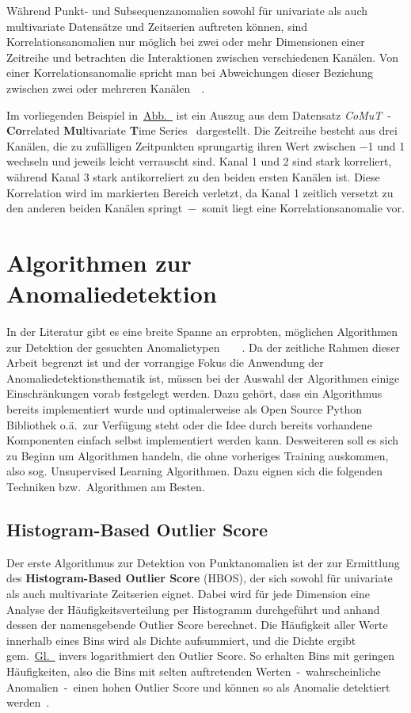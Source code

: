 Während Punkt- und Subsequenzanomalien sowohl für univariate als auch multivariate Datensätze und Zeitserien auftreten können, sind
Korrelationsanomalien nur möglich bei zwei oder mehr Dimensionen einer Zeitreihe und betrachten die Interaktionen zwischen
verschiedenen Kanälen. Von einer Korrelationsanomalie spricht man bei Abweichungen dieser Beziehung zwischen zwei oder mehreren
Kanälen~\cite[S.12-13]{Wenig2024}~\cite{Wenig2024a}.

Im vorliegenden Beispiel in~\hyperref[fig:correlation_Anomaly]{Abb.~} ist ein Auszug aus dem Datensatz
\textit{CoMuT}~- \textbf{Co}rrelated \textbf{Mu}lti\-variate \textbf{T}ime Series~\cite{NaumannCoMuT} dargestellt. Die Zeitreihe besteht
aus drei Kanälen, die zu zufälligen Zeitpunkten sprungartig ihren Wert zwischen $-$1 und 1 wechseln und jeweils leicht verrauscht sind.
Kanal 1 und 2 sind stark korreliert, während Kanal 3 stark antikorreliert zu den beiden ersten Kanälen ist. Diese Korrelation wird im
markierten Bereich verletzt, da Kanal 1 zeitlich versetzt zu den anderen beiden Kanälen springt~$-$~somit liegt eine
Korrelations\-anomalie vor.

\section{Algorithmen zur Anomaliedetektion}\label{sec:algorithmen}
In der Literatur gibt es eine breite Spanne an erprobten, möglichen Algorithmen zur Detektion der gesuchten
Anomalietypen~\cite{Schmidl2022}~\cite{BlazquezGarcia2020}~\cite{Mane2022}~\cite{Wenig2024a}. Da der zeitliche Rahmen dieser Arbeit
begrenzt ist und der vorrangige Fokus die Anwendung der Anomaliedetektionsthematik ist, müssen bei der Auswahl der Algorithmen
einige Einschränkungen vorab festgelegt werden. Dazu gehört, dass ein Algorithmus bereits implementiert wurde und optimalerweise als Open
Source Python Bibliothek o.ä.~zur Verfügung steht oder die Idee durch bereits vorhandene Komponenten einfach selbst implementiert
werden kann. Desweiteren soll es sich zu Beginn um Algorithmen handeln, die ohne vorheriges Training
auskommen, also sog. Unsupervised Learning Algorithmen. Dazu eignen sich die folgenden Techniken bzw.~Algorithmen am Besten.

\subsection{Histogram-Based Outlier Score}
Der erste Algorithmus zur Detektion von Punktanomalien ist der zur Ermittlung des \textbf{Histogram-Based Outlier Score} (HBOS), der sich
sowohl für univariate als auch multivariate Zeitserien eignet. Dabei wird für jede Dimension eine Analyse der Häufigkeitsverteilung per
Histogramm durchgeführt und anhand dessen der namensgebende Outlier Score berechnet. Die Häufigkeit aller Werte innerhalb eines Bins wird als
Dichte aufsummiert, und die Dichte ergibt gem.~\hyperref[eq:hbos]{Gl.~} invers logarithmiert den Outlier Score. So erhalten Bins
mit geringen Häufigkeiten, also die Bins mit selten auftretenden Werten~-~wahrscheinliche Anomalien~-~einen hohen Outlier Score und können
so als Anomalie detektiert werden~\cite{Goldstein2012}.

